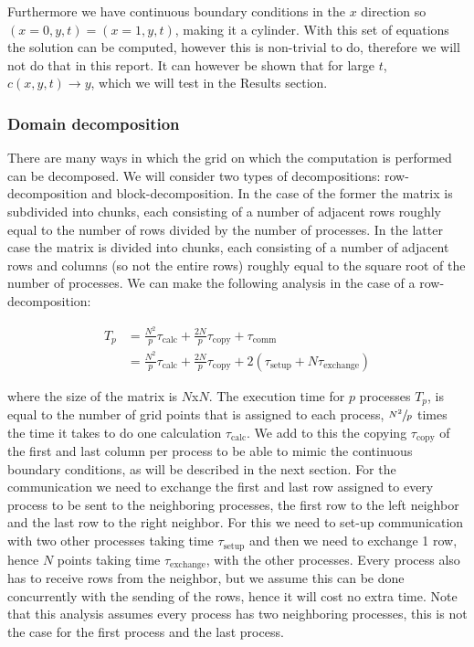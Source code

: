 \documentclass[11pt,a4paper,onecolumn]{article}
\begin{document}
Furthermore we have continuous boundary conditions in the $x$ direction so $(x=0,y,t) = (x=1,y,t)$, making it a cylinder. With this set of equations the solution can be computed, however this is non-trivial to do, therefore we will not do that in this report. It can however be shown that for large $t$, $c(x,y,t) \rightarrow y$, which we will test in the Results section.

\subsubsection{Domain decomposition}

There are many ways in which the grid on which the computation is performed can be decomposed. We will consider two types of decompositions: row-decomposition and block-decomposition. In the case of the former the matrix is subdivided into chunks, each consisting of a number of adjacent rows roughly equal to the number of rows divided by the number of processes. In the latter case the matrix is divided into chunks, each consisting of a number of adjacent rows and columns (so not the entire rows) roughly equal to the square root of the number of processes. We can make the following analysis in the case of a row-decomposition:

\begin{align}
  \label{eq:row}
  T_{p} &= \frac{N^2}{p} \tau_{\text{calc}} + \frac{2N}{p}\tau_{\text{copy}} + \tau_{\text{comm}} \\ \nonumber
  &= \frac{N^2}{p} \tau_{\text{calc}} + \frac{2N}{p}\tau_{\text{copy}} + 2(\tau_{\text{setup}} + N\tau_{\text{exchange}}) 
\end{align}

where the size of the matrix is $N$x$N$. The execution time for $p$ processes $T_p$, is equal to the number of grid points that is assigned to each process, $\sfrac{N^2}{p}$ times the time it takes to do one calculation $\tau_{\text{calc}}$. We add to this the copying $\tau_{\text{copy}}$ of the first and last column per process to be able to mimic the continuous boundary conditions, as will be described in the next section. For the communication we need to exchange the first and last row assigned to every process to be sent to the neighboring processes, the first row to the left neighbor and the last row to the right neighbor. For this we need to set-up communication with two other processes taking time $\tau_{\text{setup}}$ and then we need to exchange 1 row, hence $N$ points taking time $\tau_{\text{exchange}}$, with the other processes. Every process also has to receive rows from the neighbor, but we assume this can be done concurrently with the sending of the rows, hence it will cost no extra time. Note that this analysis assumes every process has two neighboring processes, this is not the case for the first process and the last process.
\end{document}
